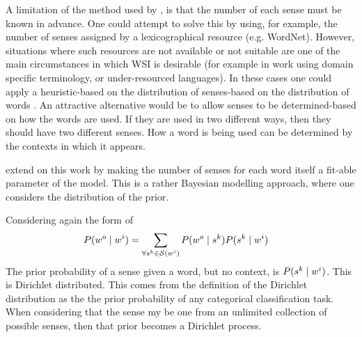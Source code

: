 \documentclass[12pt,parskip]{komatufte}
\begin{document}
A limitation of the method used by \textcite{tian2014probabilistic}, is that the number of each sense must be known in advance.
One could attempt to solve this by using, for example, the number of senses assigned by a lexicographical resource (e.g. WordNet).
However, situations where such resources are not available or not suitable are one of the main circumstances in which WSI is desirable  (for example in work using domain specific terminology, or under-resourced languages).
In these cases one could apply a heuristic-based on the distribution of senses-based on the distribution of words \parencite{zipf1945meaning}.
An attractive alternative would be to allow senses to be determined-based on how the words are used. If they are used in two different ways, then they should have two different senses.
How a word is being used can be determined by the contexts in which it appears.


 extend on this work by making the number of senses for each word itself a fit-able parameter of the model.
This is a rather Bayesian modelling approach, where one considers the distribution of the prior.




Considering again the form of 
\begin{align}
P(\n w_o\mid \n w_i) &= \sum_{\forall \n s_k \in \seq S(\n w_i)} P(\n w_o \mid \n s_k) P(\n s_k \mid \n w_i) 
\end{align}
The prior probability of a sense given a word, but no context, is 
$P(\n s_k \mid \n w_i)$.
This is Dirichlet distributed.
This comes from the definition of the Dirichlet distribution as the the prior probability of any categorical classification task.
When considering that the sense my be one from an unlimited collection of possible senses,
then that prior becomes a Dirichlet process.
\end{document}
